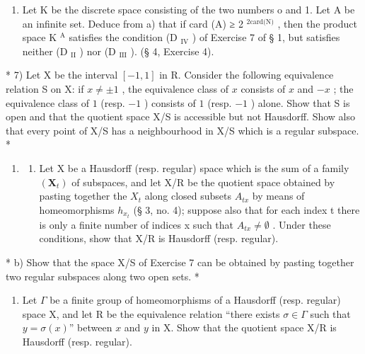 \begin{enumerate}
\def\labelenumi{\alph{enumi})}
\setcounter{enumi}{1}
\tightlist
\item
  Let K be the discrete space consisting of the two numbers o and 1. Let A be an infinite set. Deduce from a) that if card (A) ≥ 2 \(^{2\text{card(N)}}\) , then the product space K \(^{\text{A}}\) satisfies the condition (D \(_{\text{IV}}\) ) of Exercise 7 of § 1, but satisfies neither (D \(_{\text{II}}\) ) nor (D \(_{\text{III}}\) ). (§ 4, Exercise 4).
\end{enumerate}

* 7) Let X be the interval \([-1, 1]\) in R. Consider the following equivalence relation S on X: if \(x \neq \pm 1\) , the equivalence class of \(x\) consists of \(x\) and \(-x\) ; the equivalence class of \(1\) (resp. \(-1\) ) consists of \(1\) (resp. \(-1\) ) alone. Show that S is open and that the quotient space X/S is accessible but not Hausdorff. Show also that every point of X/S has a neighbourhood in X/S which is a regular subspace. *

\begin{enumerate}
\def\labelenumi{\arabic{enumi})}
\setcounter{enumi}{7}
\tightlist
\item
  \begin{enumerate}
  \def\labelenumii{\alph{enumii})}
  \tightlist
  \item
    Let X be a Hausdorff (resp. regular) space which is the sum of a family \((\mathbf{X}_{t})\) of subspaces, and let X/R be the quotient space obtained by pasting together the \(X_{t}\) along closed subsets \(A_{tx}\) by means of homeomorphisms \(h_{x_{t}}\) (§ 3, no. 4); suppose also that for each index t there is only a finite number of indices x such that \(A_{tx} \neq \emptyset\) . Under these conditions, show that X/R is Hausdorff (resp. regular).
  \end{enumerate}
\end{enumerate}

* b) Show that the space X/S of Exercise 7 can be obtained by pasting together two regular subspaces along two open sets. *

\begin{enumerate}
\def\labelenumi{\arabic{enumi})}
\setcounter{enumi}{8}
\tightlist
\item
  Let \(\Gamma\) be a finite group of homeomorphisms of a Hausdorff (resp. regular) space X, and let R be the equivalence relation ``there exists \(\sigma \in \Gamma\) such that \(y = \sigma(x)\)'' between \(x\) and \(y\) in X. Show that the quotient space X/R is Hausdorff (resp. regular).
\end{enumerate}

